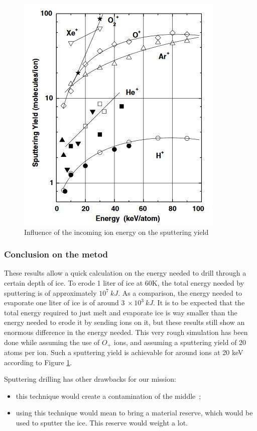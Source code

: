 \begin{figure}[htb]
\begin{center}
\includegraphics{Paul/sputteringenergy.JPG}
\end{center}
\caption{Influence of the incoming ion energy on the sputtering yield}
\label{sputteringenergy}
\end{figure}


\subsubsection{Conclusion on the metod}

These results allow a quick calculation on the energy needed to drill through a certain depth of ice. To erode 1 liter of ice at 60K, the total energy needed by sputtering is of approximately $10^{7}~kJ$. As a comparison, the energy needed to evaporate one liter of ice is of around $3~\times10^{3}~kJ$. It is to be expected that the total energy required to just melt and evaporate ice is way smaller than the energy needed to erode it by sending ions on it, but these results still show an enormous difference in the energy needed. This very rough simulation has been done while assuming the use of $O_{+}$ ions, and assuming a sputtering yield of 20 atoms per ion. Such a sputtering yield is achievable for around ions at 20 keV according to Figure \ref{sputteringenergy}.

Sputtering drilling has other drawbacks for our mission:
\begin{itemize}
\item{this technique would create a contamination of the middle~;}
\item{using this technique would mean to bring a material reserve, which would be used to sputter the ice. This reserve would weight a lot.}
\end{itemize}

